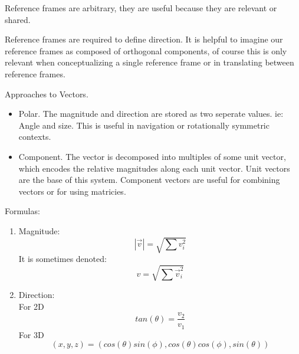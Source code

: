 \documentclass{report}
\begin{document}
\begin{description}
\begin{mdframed}
           Reference frames are arbitrary, they are useful because they
           are relevant or shared.

           \begin{center}
           \end{center}

           Reference frames are required to define direction.
           It is helpful to imagine our reference frames as composed
           of orthogonal components, of course this is only relevant
           when conceptualizing a single reference frame or in translating
           between reference frames.

           Approaches to Vectors.
           \begin{itemize}
               \item Polar. The magnitude and direction are stored
                   as two seperate values. ie: Angle and size.
                   This is useful in navigation or rotationally
                   symmetric contexts.
               \item Component. The vector is decomposed into
                   multiples of some unit vector, which encodes
                   the relative magnitudes along each unit vector.
                   Unit vectors are the base of this system.
                   Component vectors are useful for combining
                   vectors or for using matricies.
           \end{itemize}

           Formulas:
           \begin{enumerate}
               \item Magnitude:
                   \begin{displaymath}
                    |\vec{v}| = \sqrt{\sum v_i^2}
                   \end{displaymath}
                   It is sometimes denoted:
                   \begin{displaymath}
                       v = \sqrt{\sum \vec{v}_i^2}
                   \end{displaymath}
                   
               \item Direction:\\
                   For 2D
                   \begin{displaymath}
                       tan(\theta) = \frac{v_2}{v_1}
                   \end{displaymath}
                   For 3D
                   \begin{displaymath}
                        (x, y, z) = 
                        (cos(\theta)sin(\phi), cos(\theta)cos(\phi), sin(\theta))
                   \end{displaymath}
                    

\end{enumerate}
\end{mdframed}
\end{description}
\end{document}
